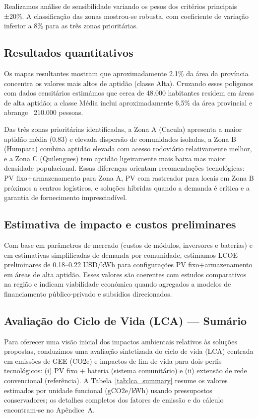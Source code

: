 \documentclass[12pt, a4paper]{article}
\begin{document}
Realizamos análise de sensibilidade variando os pesos dos critérios principais ±20\%. A classificação das zonas mostrou-se robusta, com coeficiente de variação inferior a 8\% para as três zonas prioritárias.

\subsection{Resultados quantitativos}

Os mapas resultantes mostram que aproximadamente 2.1\% da área da província concentra os valores mais altos de aptidão (classe Alta). Cruzando esses polígonos com dados censitários estimámos que cerca de 48.000 habitantes residem em áreas de alta aptidão; a classe Média inclui aproximadamente 6,5\% da área provincial e abrange ~210.000 pessoas.

Das três zonas prioritárias identificadas, a Zona A (Cacula) apresenta a maior aptidão média (0.83) e elevada dispersão de comunidades isoladas, a Zona B (Humpata) combina aptidão elevada com acesso rodoviário relativamente melhor, e a Zona C (Quilengues) tem aptidão ligeiramente mais baixa mas maior densidade populacional. Essas diferenças orientam recomendações tecnológicas: PV fixo+armazenamento para Zona A, PV com rastreador para locais em Zona B próximos a centros logísticos, e soluções híbridas quando a demanda é crítica e a garantia de fornecimento imprescindível.

\subsection{Estimativa de impacto e custos preliminares}

Com base em parâmetros de mercado (custos de módulos, inversores e baterias) e em estimativas simplificadas de demanda por comunidade, estimamos LCOE preliminares de 0.18–0.22 USD/kWh para configurações PV fixo+armazenamento em áreas de alta aptidão. Esses valores são coerentes com estudos comparativos na região e indicam viabilidade económica quando agregados a modelos de financiamento público‑privado e subsídios direcionados.

\subsection{Avaliação do Ciclo de Vida (LCA) — Sumário}

Para oferecer uma visão inicial dos impactos ambientais relativos às soluções propostas, conduzimos
uma avaliação sintetizada do ciclo de vida (LCA) centrada em emissões de GEE (CO2e) e
impactos de fim-de-vida para dois perfis tecnológicos: (i) PV fixo + bateria (sistema comunitário)
e (ii) extensão de rede convencional (referência). A Tabela~\ref{tab:lca_summary} resume os
valores estimados por unidade funcional (gCO2e/kWh) usando pressupostos conservadores; os
detalhes completos dos fatores de emissão e do cálculo encontram-se no Apêndice~A.
\end{document}
